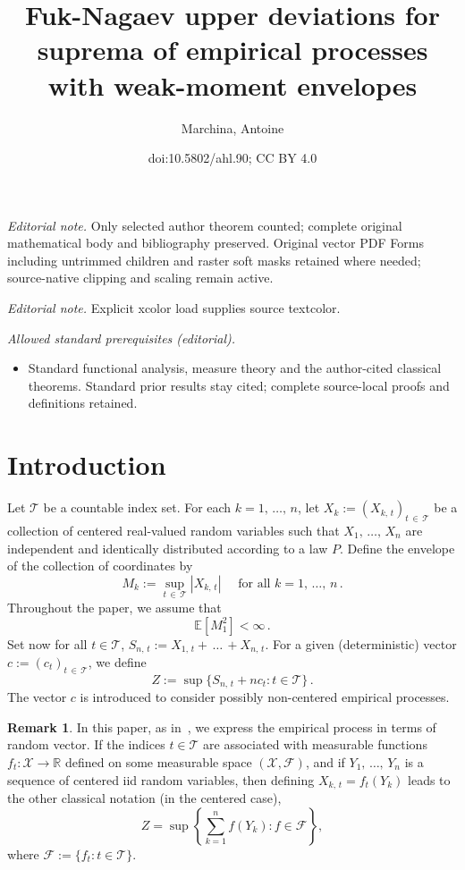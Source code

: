 \documentclass[10pt]{amsart}
\title{Fuk-Nagaev upper deviations for suprema of empirical processes with weak-moment envelopes}
\author{Marchina, Antoine}
\date{doi:10.5802/ahl.90; CC BY 4.0}
\theoremstyle{definition}\newtheorem{defi}[theo]{Definition}\newtheorem{rema}[theo]{Remark}\newtheorem{exam}[theo]{Example}\newtheorem{exem}[theo]{Example}\newtheorem{nota}[theo]{Notation}
\newcommand{\bE}{\mathbb{E}}
\newcommand{\bR}{\mathbb{R}}
\newcommand{\cF}{\mathcal{F}}
\newcommand{\cT}{\mathcal{T}}
\newcommand{\cX}{\mathcal{X}}
\newcommand{\caF}{\mathscr{F}}
\begin{document}
\maketitle
\noindent\textit{Editorial note.} Only selected author theorem counted; complete original mathematical body and bibliography preserved. Original vector PDF Forms including untrimmed children and raster soft masks retained where needed; source-native clipping and scaling remain active.\par\medskip
\noindent\textit{Editorial note.} Explicit xcolor load supplies source textcolor.\par\medskip
\noindent\textit{Allowed standard prerequisites (editorial).}\begin{itemize}
\item Standard functional analysis, measure theory and the author-cited classical theorems. Standard prior results stay cited; complete source-local proofs and definitions retained.
\end{itemize}\medskip

\section{Introduction}
Let $\cT$ be a countable index set. For each $k=1,\,\ldots,\,n$, let $X_k:=(X_{k,\,t})_{t\,\in\,\cT}$ be a collection of centered real-valued random variables such that $X_1,\,\ldots,\,X_n$ are independent and identically distributed according to a law $P$. Define the envelope of the collection of coordinates by
\begin{equation}\label{eqn:def envelope}
M_k:=\sup_{t\,\in\,\cT} \left|X_{k,\,t}\right|\quad\text{ for all }k=1,\,\ldots,\,n\,.
\end{equation}
Throughout the paper, we assume that
\begin{equation}
\bE\left[M_1^2\right]<\infty\,.
\end{equation}
Set now for all $t\in\cT$, $S_{n,\,t}:=X_{1,\,t}+\,\ldots\,+X_{n,\,t}$. For a given (deterministic) vector $c:=(c_t)_{t\,\in\,\cT}$, we define
\begin{equation}\label{eqn:def Z}
Z:=\sup\{S_{n,\,t}+nc_t:t\in\cT\}\,.
\end{equation}
The vector $c$ is introduced to consider possibly non-centered empirical processes.


\begin{rema}
In this paper, as in~\cite{BLM13, vdGL14}, we express the empirical process in terms of random vector. If the indices $t\in\cT$ are associated with measurable functions $f_t:\cX\to\bR$ defined on some measurable space $(\cX,\cF)$, and if $Y_1,\,\ldots,\,Y_n$ is a sequence of centered iid random variables, then defining $X_{k,\,t}=f_t(Y_k)$ leads to the other classical notation (in the centered case),
\[
Z=\sup\left\{\sum_{k=1}^nf(Y_k) : f\in\caF\right\},
\]
where $\caF:=\{f_t:t\in\cT\}$.
\end{rema}
\end{document}
